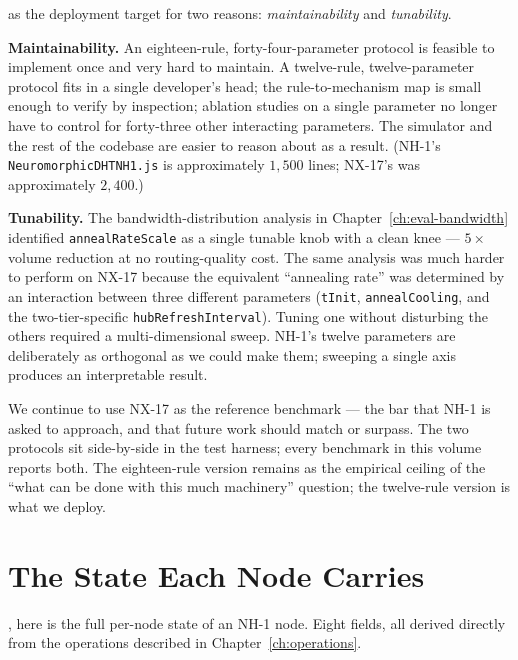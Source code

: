 \documentclass[twoside,nobib]{tufte-book}
\begin{document}
 as the deployment target for two
reasons: \emph{maintainability} and \emph{tunability}.

\textbf{Maintainability.} An eighteen-rule, forty-four-parameter
protocol is feasible to implement once and very hard to maintain.
A twelve-rule, twelve-parameter protocol fits in a single
developer's head; the rule-to-mechanism map is small enough to
verify by inspection; ablation studies on a single parameter no
longer have to control for forty-three other interacting
parameters. The simulator and the rest of the codebase are easier
to reason about as a result. (NH-1's
\texttt{NeuromorphicDHTNH1.js} is approximately $1{,}500$ lines;
NX-17's was approximately $2{,}400$.)

\textbf{Tunability.} The bandwidth-distribution analysis in
Chapter~\ref{ch:eval-bandwidth} identified
\texttt{annealRateScale} as a single tunable knob with a clean
knee --- $5\times$ volume reduction at no routing-quality cost.
The same analysis was much harder to perform on NX-17 because
the equivalent ``annealing rate'' was determined by an
interaction between three different parameters
(\texttt{tInit}, \texttt{annealCooling}, and the
two-tier-specific \texttt{hubRefreshInterval}). Tuning one
without disturbing the others required a multi-dimensional sweep.
NH-1's twelve parameters are deliberately as orthogonal as we
could make them; sweeping a single axis produces an
interpretable result.

We continue to use NX-17 as the reference benchmark --- the bar
that NH-1 is asked to approach, and that future work should match
or surpass. The two protocols sit side-by-side in the test
harness; every benchmark in this volume reports both. The
eighteen-rule version remains as the empirical ceiling of the
``what can be done with this much machinery'' question; the
twelve-rule version is what we deploy.

\section{The State Each Node Carries}
\label{sec:nh1-state}

, here is the full per-node state of
an NH-1 node. Eight fields, all derived directly from the
operations described in Chapter~\ref{ch:operations}.
\end{document}
